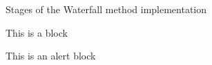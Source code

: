 \begin{frame}{Stages of the Waterfall method}
implementation
    \begin{block}{This is a block}
        \lipsum[1][1-3]
    \end{block}   
    \begin{alertblock}{This is an alert block}
        \lipsum[2][2-5]
    \end{alertblock}  
\end{frame}